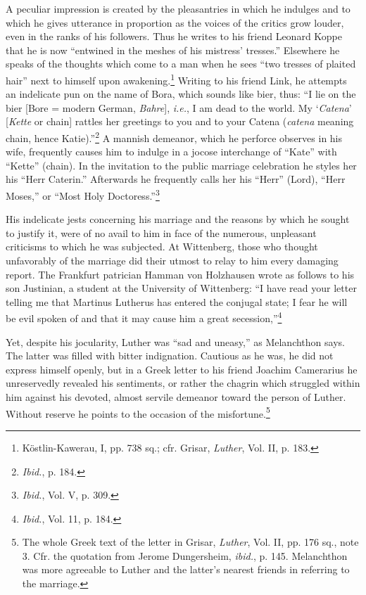 A peculiar impression is created by the pleasantries in which he
indulges and to which he gives utterance in proportion as the voices
of the critics grow louder, even in the ranks of his followers. Thus
he writes to his friend Leonard Koppe that he is now “entwined in the
meshes of his mistress’ tresses.” Elsewhere he speaks of the thoughts
which come to a man when he sees “two tresses of plaited hair” next
to himself upon awakening.\footnote
{Köstlin-Kawerau, I, pp. 738 sq.; cfr. Grisar, \textit{Luther}, Vol. II, p. 183.}
Writing to his friend Link, he attempts an
indelicate pun on the name of Bora, which sounds like
bier, thus: “I lie on the bier [Bore = modern German, \textit{Bahre}], \textit{i.e.},
I am dead to the world. My ‘\textit{Catena}’ [\textit{Kette} or chain] rattles her
greetings to you and to your Catena (\textit{catena} meaning chain, hence
Katie).”\footnote{\textit{Ibid.}, p. 184.}
A mannish demeanor, which he perforce observes in his
wife, frequently causes him to indulge in a jocose interchange of
“Kate” with “Kette” (chain). In the invitation to the public marriage
celebration he styles her his “Herr Caterin.” Afterwards he
frequently calls her his “Herr” (Lord), “Herr Moses,” or “Most
Holy Doctoress.”\footnote{\textit{Ibid.}, Vol. V, p. 309.}

His indelicate jests concerning his marriage and the reasons by
which he sought to justify it, were of no avail to him in face of
the numerous, unpleasant criticisms to which he was subjected. At
Wittenberg, those who thought unfavorably of the marriage did
their utmost to relay to him every damaging report. The Frankfurt
patrician Hamman von Holzhausen wrote as follows to his son Justinian,
a student at the University of Wittenberg: “I have read your
letter telling me that Martinus Lutherus has entered the conjugal
state; I fear he will be evil spoken of and that it may cause him a great
secession,”\footnote{\textit{Ibid.}, Vol. 11, p. 184.}

Yet, despite his jocularity, Luther was “sad and uneasy,” as Melanchthon
says. The latter was filled with bitter indignation. Cautious as he was,
he did not express himself openly, but in a Greek
letter to his friend Joachim Camerarius he unreservedly revealed his
sentiments, or rather the chagrin which struggled within him against
his devoted, almost servile demeanor toward the person of Luther.
Without reserve he points to the occasion of the misfortune.\footnote
{The whole Greek text of the letter in Grisar, \textit{Luther}, Vol. II, pp. 176 sq., note 3.
Cfr. the quotation from Jerome Dungersheim, \textit{ibid.}, p. 145. Melanchthon was more
agreeable to Luther and the latter’s nearest friends in referring to the marriage.}

